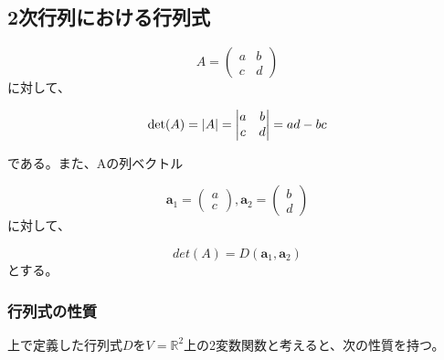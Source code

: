 \documentclass[dvipdfmx,autodetect-engine]{jsarticle}
\newcommand{\vecSpace}[1]{\mathbb{R}^{#1}}
\DeclarePairedDelimiter{\abs}{\lvert}{\rvert}
\begin{document}
\subsection{2次行列における行列式}


$$
A = \begin{pmatrix}
a & b \\
c & d
\end{pmatrix}
$$
に対して、

$$
\det(A) = \abs{A} = \begin{vmatrix}
a & b \\
c & d \\
\end{vmatrix} = ad - bc
$$

である。また、Aの列ベクトル

$$
\bm{a}_1 = \begin{pmatrix}
a \\
c
\end{pmatrix},
\bm{a}_2 = \begin{pmatrix}
b \\
d
\end{pmatrix}
$$に対して、

$$
det(A) = D(\bm{a}_1, \bm{a}_2)
$$
とする。

\subsubsection{行列式の性質}

上で定義した行列式$D$を$V = \vecSpace{2}$上の2変数関数と考えると、次の性質を持つ。
\end{document}
